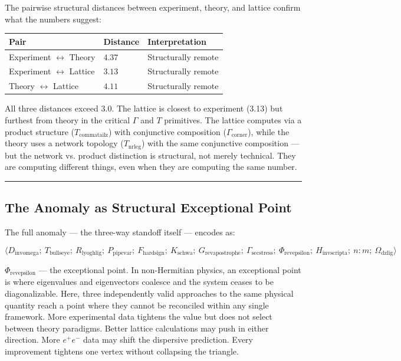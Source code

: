 \documentclass[12pt,a4paper]{article}
\begin{document}
The pairwise structural distances between experiment, theory, and lattice confirm what the numbers suggest:

\begin{table}[htbp]
\centering
\small
{}
\begin{tabularx}{\textwidth}{>{\centering\arraybackslash}X >{\centering\arraybackslash}X >{\centering\arraybackslash}X}
\toprule
\rowcolor{gray!25}\textbf{Pair} & \textbf{Distance} & \textbf{Interpretation} \\
\midrule
\rowcolors{1}{white}{gray!10}
Experiment $\leftrightarrow$ Theory & $4.37$ & Structurally remote \\
Experiment $\leftrightarrow$ Lattice & $3.13$ & Structurally remote \\
Theory $\leftrightarrow$ Lattice & $4.11$ & Structurally remote \\
\bottomrule
\end{tabularx}
\end{table}

All three distances exceed 3.0. The lattice is closest to experiment (3.13) but furthest from theory in the critical $\Gamma$ and $T$ primitives. The lattice computes via a product structure ($T_{\text{commatailz}}$) with conjunctive composition ($\Gamma_{\text{corner}}$), while the theory uses a network topology ($T_{\text{nrleg}}$) with the same conjunctive composition --- but the network vs. product distinction is structural, not merely technical. They are computing different things, even when they are computing the same number.

\begin{center}
\rule{0.5\textwidth}{0.4pt}
\end{center}

\subsection{The Anomaly as Structural Exceptional Point}

The full anomaly --- the three-way standoff itself --- encodes as:

\[\langle D_{\text{invomega}};\ T_{\text{bullseye}};\ R_{\text{lyoghlig}};\ P_{\text{pipevar}};\ F_{\text{hardsign}};\ K_{\text{schwa}};\ G_{\text{revapostrophe}};\ \Gamma_{\text{secstress}};\ \Phi_{\text{revepsilon}};\ H_{\text{invscripta}};\ n{:}m;\ \Omega_{\text{dzlig}} \rangle\]

$\Phi_{\text{revepsilon}}$ --- the exceptional point. In non-Hermitian physics, an exceptional point is where eigenvalues and eigenvectors coalesce and the system ceases to be diagonalizable. Here, three independently valid approaches to the same physical quantity reach a point where they cannot be reconciled within any single framework. More experimental data tightens the value but does not select between theory paradigms. Better lattice calculations may push in either direction. More $e^+e^-$ data may shift the dispersive prediction. Every improvement tightens one vertex without collapsing the triangle.
\end{document}
